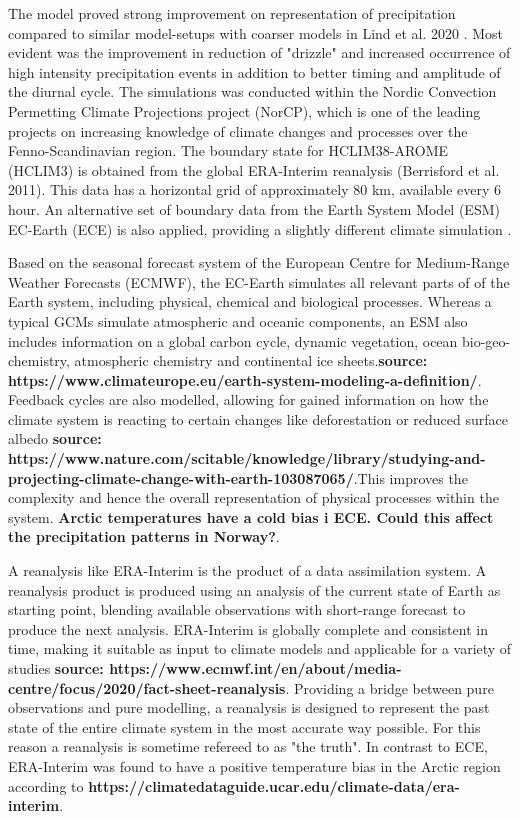 The model proved strong improvement on representation of precipitation compared to similar model-setups with coarser models in Lind et al. 2020 \cite{lind_arome}. Most evident was the improvement in reduction of "drizzle" and increased occurrence of high intensity precipitation events in addition to better timing and amplitude of the diurnal cycle. The simulations was conducted within the Nordic Convection Permetting Climate Projections project (NorCP), which is one of the leading projects on increasing knowledge of climate changes and processes over the Fenno-Scandinavian region.  The boundary state for HCLIM38-AROME (HCLIM3) is obtained from the global ERA-Interim reanalysis (Berrisford et al. 2011)\cite{erai}. This data has a horizontal grid of approximately 80 km, available every 6 hour. An alternative set of boundary data from the Earth System Model (ESM) EC-Earth (ECE) is also applied, providing a slightly different climate simulation \cite{lind_arome}.    

Based on the seasonal forecast system of the European Centre for Medium-Range Weather Forecasts (ECMWF), the EC-Earth simulates all relevant parts of of the Earth system, including physical, chemical and biological processes. Whereas a typical GCMs simulate atmospheric and oceanic components, an ESM also includes information on a global carbon cycle, dynamic vegetation, ocean bio-geo-chemistry, atmospheric chemistry and continental ice sheets.\textbf{source: https://www.climateurope.eu/earth-system-modeling-a-definition/}. Feedback cycles are also modelled, allowing for gained information on how the climate system is reacting to certain changes like deforestation or reduced surface albedo \textbf{source: https://www.nature.com/scitable/knowledge/library/studying-and-projecting-climate-change-with-earth-103087065/}.This improves the complexity and hence the overall representation of physical processes within the system. \textbf{Arctic temperatures have a cold bias i ECE. Could this affect the precipitation patterns in Norway?}.

A reanalysis like ERA-Interim is the product of a data assimilation system. A reanalysis product is produced using an analysis of the current state of Earth as starting point, blending available observations with short-range forecast to produce the next analysis. ERA-Interim is globally complete and consistent in time, making it suitable as input to climate models and applicable for a variety of studies \textbf{source: https://www.ecmwf.int/en/about/media-centre/focus/2020/fact-sheet-reanalysis}. Providing a bridge between pure observations and pure modelling, a reanalysis is designed to represent the past state of the entire climate system in the most accurate way possible. For this reason a reanalysis is sometime refereed to as "the truth". In contrast to ECE, ERA-Interim was found to have a positive temperature bias in the Arctic region according to \textbf{https://climatedataguide.ucar.edu/climate-data/era-interim}.  


